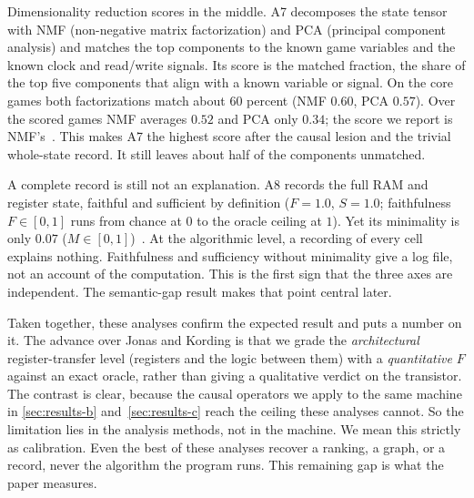 Dimensionality reduction scores in the middle. A7 decomposes the state tensor with
NMF (non-negative matrix factorization) and PCA (principal component analysis) and
matches the top components to the known game variables and the known clock and
read/write signals. Its score is the matched fraction, the share of the top five
components that align with a known variable or signal. On the core games both
factorizations match about 60 percent (NMF $0.60$, PCA $0.57$). Over the scored
games NMF averages $0.52$ and PCA only $0.34$; the score we report is
NMF's~\cite{leaderboardP2}. This makes A7 the highest score after the causal lesion
and the trivial whole-state record. It still leaves about half of the components
unmatched.

A complete record is still not an explanation. A8 records the full RAM and
register state, faithful and sufficient by definition ($F = 1.0$, $S = 1.0$; faithfulness $F\in[0,1]$ runs from chance at $0$ to the oracle ceiling at $1$).
Yet its minimality is only $0.07$ ($M\in[0,1]$)~\cite{leaderboardP2}. At the algorithmic level,
a recording of every cell explains nothing. Faithfulness and sufficiency without
minimality give a log file, not an account of the computation. This is the first
sign that the three axes are independent. The semantic-gap result makes that
point central later.

Taken together, these analyses confirm the expected result and puts a number on
it. The advance over Jonas and Kording is that we grade the \emph{architectural}
register-transfer level (registers and the logic between them) with a \emph{quantitative} $F$ against an exact oracle,
rather than giving a qualitative verdict on the transistor. The contrast is
clear, because the causal operators we apply to the same machine in
\Sectionname\ref{sec:results-b} and~\Sectionname\ref{sec:results-c} reach the ceiling these analyses cannot. So the limitation lies in the analysis methods, not in the machine. We
mean this strictly as calibration. Even the best of these analyses recover a
ranking, a graph, or a record, never the algorithm the program runs. This
remaining gap is what the paper measures.

